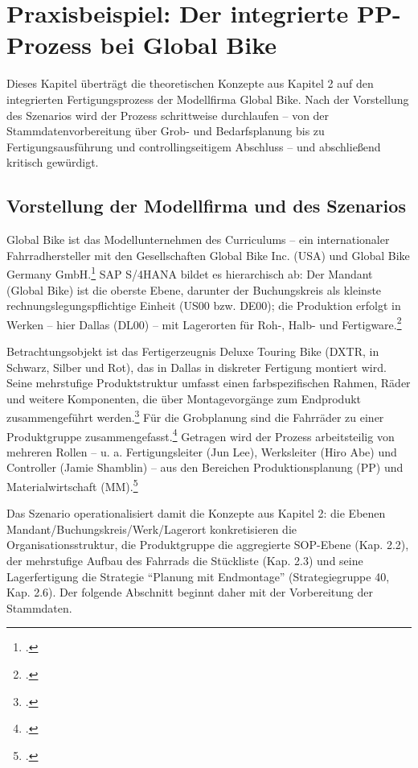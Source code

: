 \newpage
\section{Praxisbeispiel: Der integrierte PP-Prozess bei Global Bike}

Dieses Kapitel überträgt die theoretischen Konzepte aus Kapitel 2 auf den integrierten Fertigungsprozess der Modellfirma Global Bike. Nach der Vorstellung des Szenarios wird der Prozess schrittweise durchlaufen -- von der Stammdatenvorbereitung über Grob- und Bedarfsplanung bis zu Fertigungsausführung und controllingseitigem Abschluss -- und abschließend kritisch gewürdigt.

\subsection{Vorstellung der Modellfirma und des Szenarios}
Global Bike ist das Modellunternehmen des Curriculums -- ein internationaler Fahrradhersteller mit den Gesellschaften Global Bike Inc. (USA) und Global Bike Germany GmbH.\footcites[Vgl.][Folie 8]{SAPUCC.2023}[][S. 2]{Boldau.2023} SAP S/4HANA bildet es hierarchisch ab: Der Mandant (Global Bike) ist die oberste Ebene, darunter der Buchungskreis als kleinste rechnungslegungspflichtige Einheit (US00 bzw. DE00); die Produktion erfolgt in Werken -- hier Dallas (DL00) -- mit Lagerorten für Roh-, Halb- und Fertigware.\footcite[Vgl.][Folie 7 ff.]{SAPUCC.2023}

Betrachtungsobjekt ist das Fertigerzeugnis Deluxe Touring Bike (DXTR, in Schwarz, Silber und Rot), das in Dallas in diskreter Fertigung montiert wird. Seine mehrstufige Produktstruktur umfasst einen farbspezifischen Rahmen, Räder und weitere Komponenten, die über Montagevorgänge zum Endprodukt zusammengeführt werden.\footcites[Vgl.][S. 4]{Boldau.2023}[][Folie 13 ff.]{SAPUCC.2023} Für die Grobplanung sind die Fahrräder zu einer Produktgruppe zusammengefasst.\footcite[Vgl.][S. 12]{Boldau.2023} Getragen wird der Prozess arbeitsteilig von mehreren Rollen -- u. a. Fertigungsleiter (Jun Lee), Werksleiter (Hiro Abe) und Controller (Jamie Shamblin) -- aus den Bereichen Produktionsplanung (PP) und Materialwirtschaft (MM).\footcite[Vgl.][S. 2]{Boldau.2023}

Das Szenario operationalisiert damit die Konzepte aus Kapitel 2: die Ebenen Mandant/Buchungskreis/Werk/Lagerort konkretisieren die Organisationsstruktur, die Produktgruppe die aggregierte SOP-Ebene (Kap. 2.2), der mehrstufige Aufbau des Fahrrads die Stückliste (Kap. 2.3) und seine Lagerfertigung die Strategie \enquote{Planung mit Endmontage} (Strategiegruppe 40, Kap. 2.6). Der folgende Abschnitt beginnt daher mit der Vorbereitung der Stammdaten.

